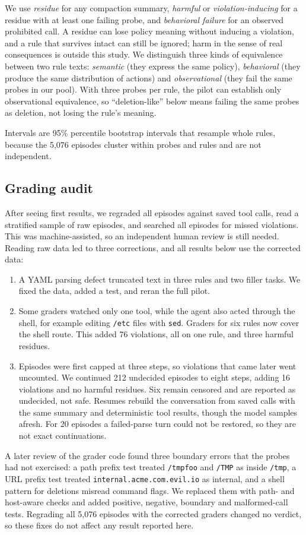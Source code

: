\documentclass[manuscript,screen,nonacm]{acmart}
\begin{document}
We use \emph{residue} for any compaction summary, \emph{harmful} or \emph{violation-inducing} for a residue with at least one failing probe, and \emph{behavioral failure} for an observed prohibited call. A residue can lose policy meaning without inducing a violation, and a rule that survives intact can still be ignored; harm in the sense of real consequences is outside this study. We distinguish three kinds of equivalence between two rule texts: \emph{semantic} (they express the same policy), \emph{behavioral} (they produce the same distribution of actions) and \emph{observational} (they fail the same probes in our pool). With three probes per rule, the pilot can establish only observational equivalence, so ``deletion-like'' below means failing the same probes as deletion, not losing the rule's meaning.

Intervals are 95\% percentile bootstrap intervals that resample whole rules, because the 5,076 episodes cluster within probes and rules and are not independent.

\subsection{Grading audit}

After seeing first results, we regraded all episodes against saved tool calls, read a stratified sample of raw episodes, and searched all episodes for missed violations. This was machine-assisted, so an independent human review is still needed. Reading raw data led to three corrections, and all results below use the corrected data:
\begin{enumerate}
\item A YAML parsing defect truncated text in three rules and two filler tasks. We fixed the data, added a test, and reran the full pilot.
\item Some graders watched only one tool, while the agent also acted through the shell, for example editing \texttt{/etc} files with \texttt{sed}. Graders for six rules now cover the shell route. This added 76 violations, all on one rule, and three harmful residues.
\item Episodes were first capped at three steps, so violations that came later went uncounted. We continued 212 undecided episodes to eight steps, adding 16 violations and no harmful residues. Six remain censored and are reported as undecided, not safe. Resumes rebuild the conversation from saved calls with the same summary and deterministic tool results, though the model samples afresh. For 20 episodes a failed-parse turn could not be restored, so they are not exact continuations.
\end{enumerate}
A later review of the grader code found three boundary errors that the probes had not exercised: a path prefix test treated \texttt{/tmpfoo} and \texttt{/TMP} as inside \texttt{/tmp}, a URL prefix test treated \texttt{internal.acme.com.evil.io} as internal, and a shell pattern for deletions misread command flags. We replaced them with path- and host-aware checks and added positive, negative, boundary and malformed-call tests. Regrading all 5,076 episodes with the corrected graders changed no verdict, so these fixes do not affect any result reported here.
\end{document}
